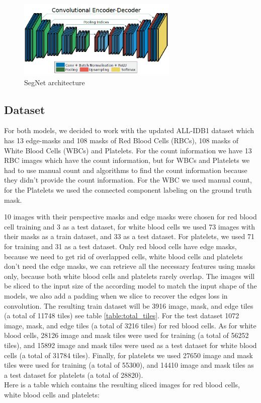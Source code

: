 \documentclass[conference]{IEEEtran}
\begin{document}
\vspace{0.1in}

\begin{figure}
\centering
  \vspace{-0.1in}
    \centerline{\includegraphics[width = 3in]{images/segnet.png}}
    \caption{SegNet architecture}
\end{figure}

\subsection{Dataset}
\hspace{\parindent}
For both models, we decided to work with the updated ALL-IDB1 dataset which has 13 edge-masks and 108 masks of Red Blood Cells (RBCs), 108 masks of White Blood Cells (WBCs) and Platelets. For the count information we have 13 RBC images which have the count information, but for WBCs and Platelets we had to use manual count and algorithms to find the count information because they didn't provide the count information. For the WBC we used manual count, for the Platelets we used the connected component labeling on the ground truth mask.\

10 images with their perspective masks and edge masks were chosen for red blood cell training and 3 as a test dataset, for white blood cells we used 73 images with their masks as a train dataset, and 33 as a test dataset.
For platelets, we used 71 for training and 31 as a test dataset.
Only red blood cells have edge masks, because we need to get rid of overlapped cells, white blood cells and platelets don't need the edge masks, we can retrieve all the necessary features using masks only, because both white blood cells and platelets rarely overlap.
The images will be sliced to the input size of the according model to match the input shape of the models, we also add a padding when we slice to recover the edges loss in convolution.
The resulting train dataset will be 3916 image, mask, and edge tiles (a total of 11748 tiles) see table \ref{table:total_tiles}.
For the test dataset 1072 image, mask, and edge tiles (a total of 3216 tiles) for red blood cells.
As for white blood cells, 28126 image and mask tiles were used for training (a total of 56252 tiles), and 15892 image and mask tiles were used as a test dataset for white blood cells (a total of 31784 tiles).
Finally, for platelets we used 27650 image and mask tiles were used for training (a total of 55300), and 14410 image and mask tiles as a test dataset for platelets (a total of 28820).\\
Here is a table which contains the resulting sliced images for red blood cells, white blood cells and platelets:
\end{document}
